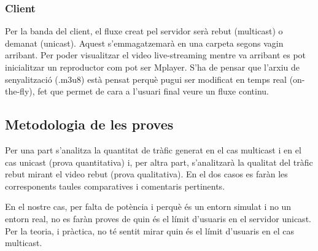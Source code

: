 \subsubsection{Client}
{
    Per la banda del client, el fluxe creat pel servidor serà rebut (multicast) o demanat (unicast). Aquest s'emmagatzemarà 
    en una carpeta segons vagin arribant. Per poder visualitzar el video live-streaming mentre va arribant es pot inicialitzar
    un reproductor com pot ser Mplayer. S'ha de pensar que l'arxiu de senyalització (.m3u8) està pensat perquè pugui ser modificat
    en temps real (on-the-fly), fet que permet de cara a l'usuari final veure un fluxe continu.
}

\subsection{Metodologia de les proves}
{
    Per una part s'analitza la quantitat de tràfic generat en el cas multicast i en el cas unicast (prova quantitativa) i,
    per altra part, s'analitzarà la qualitat del tràfic rebut mirant el video rebut (prova qualitativa). En el dos casos 
    es faràn les corresponents taules comparatives i comentaris pertinents.

    En el nostre cas, per falta de potència i perquè és un entorn simulat i no un entorn real, no es faràn proves de quin
    és el límit d'usuaris en el servidor unicast. Per la teoria, i pràctica, no té sentit mirar quin és el límit d'usuaris
    en el cas multicast.
}


